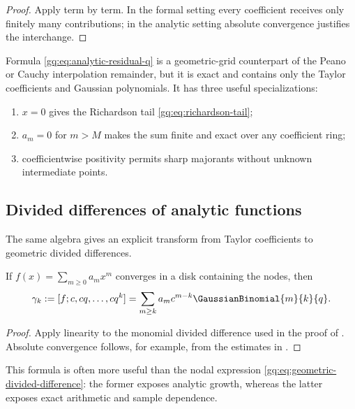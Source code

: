\begin{proof}
Apply  term by term.  In the formal setting every
coefficient receives only finitely many contributions; in the analytic
setting absolute convergence justifies the interchange.
\end{proof}

Formula \eqref{gq:eq:analytic-residual-q} is a geometric-grid counterpart of the
Peano or Cauchy interpolation remainder, but it is exact and contains only
the Taylor coefficients and Gaussian polynomials.  It has three useful
specializations:
\begin{enumerate}
\item $x=0$ gives the Richardson tail \eqref{gq:eq:richardson-tail};
\item $a_m=0$ for $m>M$ makes the sum finite and exact over any coefficient
      ring;
\item coefficientwise positivity permits sharp majorants without unknown
      intermediate points.
\end{enumerate}

\subsection{Divided differences of analytic functions}

The same algebra gives an explicit transform from Taylor coefficients to
geometric divided differences.

\begin{proposition}
\label{gq:prop:taylor-newton-transform}
If $f(x)=\sum_{m\ge0}a_mx^m$ converges in a disk containing the nodes, then
\begin{equation}
 \gamma_k:=[f;c,cq,\ldots,cq^k]
 =\sum_{m\ge k}a_mc^{m-k}\GaussianBinomial{m}{k}{q}.
 \label{gq:eq:taylor-to-newton}
\end{equation}
\end{proposition}

\begin{proof}
Apply linearity to the monomial divided difference used in the proof of
.  Absolute convergence follows, for example,
from the estimates in .
\end{proof}

This formula is often more useful than the nodal expression
\eqref{gq:eq:geometric-divided-difference}: the former exposes analytic growth,
whereas the latter exposes exact arithmetic and sample dependence.


